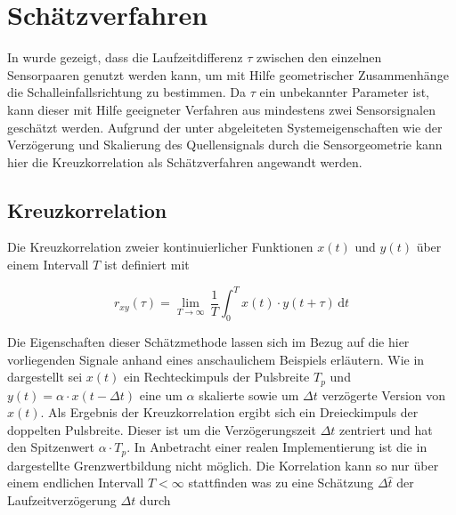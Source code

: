 \section{Schätzverfahren}
\label{sec:Schaetzverfahren}
In  wurde gezeigt, dass die Laufzeitdifferenz $\tau$ zwischen den einzelnen Sensorpaaren genutzt werden kann, um mit Hilfe geometrischer Zusammenhänge die Schalleinfallsrichtung zu bestimmen. Da $\tau$ ein unbekannter Parameter ist, kann dieser mit Hilfe geeigneter Verfahren aus mindestens zwei Sensorsignalen geschätzt werden.
Aufgrund der unter  abgeleiteten Systemeigenschaften wie der Verzögerung und Skalierung des Quellensignals durch die Sensorgeometrie kann hier die Kreuzkorrelation als Schätzverfahren angewandt werden.

\subsection{Kreuzkorrelation}
\label{subsec:Kreuzkorrelation}
Die Kreuzkorrelation zweier kontinuierlicher Funktionen $x(t)$ und $y(t)$ über einem Intervall $T$ ist definiert mit

\begin{equation}\label{eq:kreuzkorrelation}
    r_{xy}(\tau) = \lim_{T \to \infty} \, \frac{1}{T} \int_{0}^{T} x(t) \cdot y(t+\tau) \, \mathrm{d}t
\end{equation}

Die Eigenschaften dieser Schätzmethode lassen sich im Bezug auf die hier vorliegenden Signale anhand eines anschaulichem Beispiels erläutern. Wie in  dargestellt sei $x(t)$ ein Rechteckimpuls der Pulsbreite $T_p$ und $y(t) = \alpha \cdot x(t-\Delta t)$ eine um $\alpha$ skalierte sowie um $\Delta t$ verzögerte Version von $x(t)$. Als Ergebnis der Kreuzkorrelation ergibt sich ein Dreieckimpuls der doppelten Pulsbreite. Dieser ist um die Verzögerungszeit $\Delta t$ zentriert und hat den Spitzenwert $\alpha \cdot T_p$. In Anbetracht einer realen Implementierung ist die in  dargestellte Grenzwertbildung nicht möglich. Die Korrelation kann so nur über einem endlichen Intervall $T<\infty$ stattfinden was zu eine Schätzung $\Delta \hat t$ der Laufzeitverzögerung $ \Delta t$ durch


